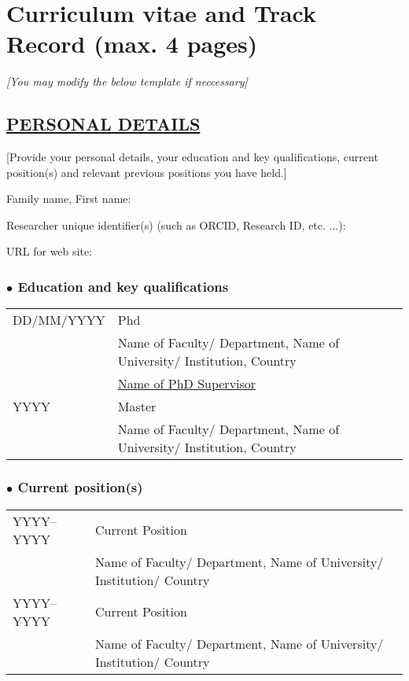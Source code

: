 \documentclass[b1]{erc} %
\begin{document}
\newpage

\section{Curriculum vitae and Track Record (max. 4 pages)}

\textit{[You may modify the below template if neccessary]}

\subsection*{\underline{PERSONAL DETAILS}}

[Provide your personal details, your education and key qualifications, current position(s) and relevant previous positions you have held.]


\noindent Family name, First name:

\noindent Researcher unique identifier(s) (such as ORCID, Research ID, etc. ...):

\noindent URL for web site: 		

\subsubsection*{$\bullet$ Education and key qualifications}

\begin{tabular}{m{8em} m{32em}}
     DD/MM/YYYY & Phd \\
                & Name of Faculty/ Department, Name of University/ Institution, Country \\
		& \underline{Name of PhD Supervisor} \\
     YYYY       & Master \\
                & Name of Faculty/ Department, Name of University/ Institution, Country \\
\end{tabular}

\subsubsection*{$\bullet$ Current position(s)}

\begin{tabular}{m{8em} m{32em}}
     YYYY--YYYY	& Current Position \\
                & Name of Faculty/ Department, Name of University/ Institution/ Country \\
     YYYY--YYYY	& Current Position \\
                & Name of Faculty/ Department, Name of University/ Institution/ Country \\
\end{tabular}
\end{document}
